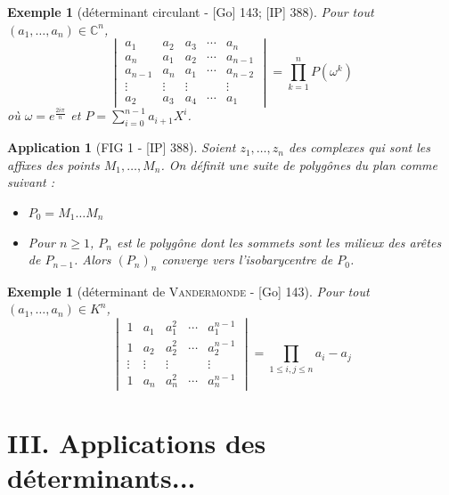 \documentclass[10pt, a4paper, parskip=full, twoside, twocolumn]{report}
\newtheorem{example}[definition]{Exemple}
\newtheorem{application}[definition]{Application}
\newcommand{\IC}{\mathbb{C}}
\begin{document}
\begin{tcolorbox}[
    breakable, %
    colback=developpement, %
    colframe=gray!0!black, %
    boxrule=0pt, %
    arc=1mm, %
	boxsep=0pt,
	left=0pt, right=0pt, top=0pt, bottom=0pt
]
\begin{example}[déterminant circulant - \textnormal{[Go] 143; [IP] 388}]
	\label{149dev11}
	Pour tout $(a_1,\dots, a_n)\in \IC^n$,
	$$\begin{vmatrix}
		a_1&a_2&a_3&\cdots &a_n \\
		a_n&a_1&a_2&\cdots &a_{n-1} \\
		a_{n-1}&a_n&a_1&\cdots &a_{n-2} \\
		\vdots&\vdots&\vdots& &\vdots \\
		a_{2}&a_3&a_4&\cdots &a_{1}
	\end{vmatrix} = \prod_{k=1}^{n}P(\omega^k)$$
	où $\omega = e^{\frac{2i\pi}{n}}$ et $P=\sum_{i=0}^{n-1} a_{i+1}X^i$.
\end{example}

\begin{application}[FIG 1 - \textnormal{[IP] 388}]
	\label{149dev12}
	Soient $z_1,\dots, z_n$ des complexes qui sont les affixes des points $M_1,\dots,M_n$.
	On définit une suite de polygônes du plan comme suivant :
	\begin{itemize}
		\item $P_0=M_1\dots M_n$
		\item Pour $n\geq 1$, $P_n$ est le polygône dont les sommets sont les milieux des arêtes de $P_{n-1}$.
		Alors $(P_n)_n$ converge vers l'isobarycentre de $P_0$.
	\end{itemize}
\end{application}
\end{tcolorbox}

\begin{example}[déterminant de \textsc{Vandermonde} - \textnormal{[Go] 143}]
	Pour tout $(a_1,\dots, a_n)\in K^n$,
	$$\begin{vmatrix}
		1&a_1&a_1^2&\cdots & a_1^{n-1} \\
		1&a_2&a_2^2&\cdots & a_2^{n-1} \\
		\vdots&\vdots&\vdots& & \vdots \\
		1&a_n&a_n^2&\cdots & a_n^{n-1}
	\end{vmatrix} = \prod_{1\leq i,j\leq n} a_i-a_j$$
\end{example}

\section*{III. Applications des déterminants...}
\end{document}
